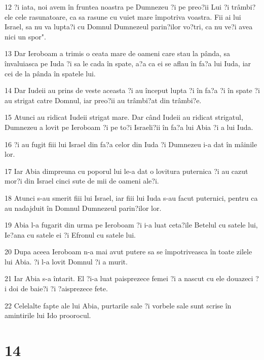 \par 12 ?i iata, noi avem în fruntea noastra pe Dumnezeu ?i pe preo?ii Lui ?i trâmbi?ele cele rasunatoare, ca sa rasune cu vuiet mare împotriva voastra. Fii ai lui Israel, sa nu va lupta?i cu Domnul Dumnezeul parin?ilor vo?tri, ca nu ve?i avea nici un spor".
\par 13 Dar Ieroboam a trimis o ceata mare de oameni care stau la pânda, sa învaluiasca pe Iuda ?i sa le cada în spate, a?a ca ei se aflau în fa?a lui Iuda, iar cei de la pânda în spatele lui.
\par 14 Dar Iudeii au prins de veste aceasta ?i au început lupta ?i în fa?a ?i în spate ?i au strigat catre Domnul, iar preo?ii au trâmbi?at din trâmbi?e.
\par 15 Atunci au ridicat Iudeii strigat mare. Dar când Iudeii au ridicat strigatul, Dumnezeu a lovit pe Ieroboam ?i pe to?i Israeli?ii în fa?a lui Abia ?i a lui Iuda.
\par 16 ?i au fugit fiii lui Israel din fa?a celor din Iuda ?i Dumnezeu i-a dat în mâinile lor.
\par 17 Iar Abia dimpreuna cu poporul lui le-a dat o lovitura puternica ?i au cazut mor?i din Israel cinci sute de mii de oameni ale?i.
\par 18 Atunci s-au smerit fiii lui Israel, iar fiii lui Iuda s-au facut puternici, pentru ca au nadajduit în Domnul Dumnezeul parin?ilor lor.
\par 19 Abia l-a fugarit din urma pe Ieroboam ?i i-a luat ceta?ile Betelul cu satele lui, Ie?ana cu satele ei ?i Efronul cu satele lui.
\par 20 Dupa aceea Ieroboam n-a mai avut putere sa se împotriveasca în toate zilele lui Abia. ?i l-a lovit Domnul ?i a murit.
\par 21 Iar Abia s-a întarit. El ?i-a luat paisprezece femei ?i a nascut cu ele douazeci ?i doi de baie?i ?i ?aisprezece fete.
\par 22 Celelalte fapte ale lui Abia, purtarile sale ?i vorbele sale sunt scrise în amintirile lui Ido proorocul.

\chapter{14}

